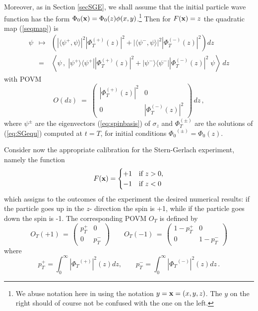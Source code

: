 \documentclass[12pt]{article}
\newcommand{\wf}{wave function}
\begin{document}
Moreover, as in Section \ref{secSGE}, we shall assume that the initial
particle \wf{} has the form $\Phi_{0}({\bf x)}= \Phi_{0}(z)
\phi(x,y)$.\footnote{We abuse notation here in using the notation $ y
   = {\bf x} = (x,y,z)$. The $y$ on the right should of course not be
   confused with the one on the left.}  Then for $F({\bf x}) = z$ the
quadratic map (\ref{seqmap}) is
\begin{eqnarray*}
\psi &\mapsto& \left(
|\langle\psi^+, \psi\rangle|^2 |\Phi^{(+)}_{T}(z)|^{2}   +
|\langle\psi^-, \psi\rangle|^2 |\Phi^{(-)}_{T}(z)|^{2} \right)dz\\
&=& \left\langle\psi\,,\;
|\psi^+\rangle\langle\psi^+||\Phi^{(+)}_{T}(z)|^{2}
+
|\psi^-\rangle\langle\psi^-||\Phi^{(-)}_{T}(z)|^{2}\;
   \psi \right\rangle\, dz
\end{eqnarray*}
with POVM
\begin{equation}
O(dz)\; = \;
\left( \begin{array}{cc} |\Phi^{(+)}_{T}(z)|^{2} & 0 \\ 0 &
   |\Phi^{(-)}_{T}(z)|^{2} \end{array} \right) \, dz \, ,
\label{eq:povmspin}
\end{equation}
where $\psi^{\pm}$ are the eigenvectors (\ref{eq:spinbasis}) of
$\sigma_{z}$ and $\Phi^{(\pm)}_{T}$ are the solutions of
(\ref{eq:SGequ}) computed at $t=T$, for initial conditions
${\Phi_0}^{(\pm)}=\Phi_0(z)$.

Consider now the appropriate calibration for the Stern-Gerlach
experiment, namely the function
\begin{equation}
F({\bf x}) =\begin{cases} +1 & \text{if $z>0$},\\
-1& \text{if $z<0$}
\end{cases}
\label{eq:rigcal}
\end{equation}
which assigns to the outcomes of the experiment the desired numerical
results: if the particle goes up in the $z$- direction the spin is +1,
while if the particle goes down the spin is -1.  The corresponding
POVM $O_{T}$ is defined by
$$
O_{T}(+1) \,=\, \left( \begin{array}{cc} p_{T}^{+} & 0 \\ 0 &
     p_{T}^- \end{array} \right) \qquad O_{T}(-1) \,=\, \left(
    \begin{array}{cc} 1-p_{T}^{+} & 0 \\ 0 & 1-p_{T}^-
   \end{array} \right)
$$
where $$
p_{T}^+ = \int_0^\infty|{\Phi_T}^{(+)}|^2(z)dz,\qquad
p_{T}^- = \int_0^\infty |{\Phi_T}^{(-)}|^2(z)dz\, .$$
\end{document}
